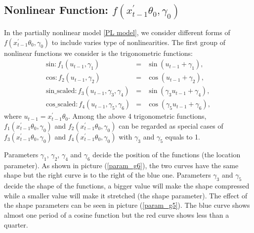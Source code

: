 \documentclass[a4paper,12pt,times,numbered,print,index]{report}
\numberwithin{equation}{section}
\begin{document}
\subsection{Nonlinear Function: $f\left(x_{t-1}^{\prime }\theta _{0},\gamma _{0}\right)$}
In the partially nonlinear model \ref{PL model}, we consider different forms of $f\left(x_{t-1}^{\prime }\theta _{0},\gamma _{0}\right)$ to include varies type of nonlinearities. The first group of nonlinear functions we consider is the trigonometric functions: 
\begin{eqnarray*}
	\text{sin}: f_{1}\left( u_{t-1},\gamma _{1}\right) &=&\sin \left( u_{t-1}+\gamma_{1}\right),  \\
	\text{cos}: f_{2}\left( u_{t-1},\gamma _{2}\right) &=&\cos \left( u_{t-1}+\gamma_{2}\right), \\
	\text{sin\_scaled}: f_{3}\left( u_{t-1},\gamma_{3}, \gamma_{4}\right) &=&\sin \left( \gamma_{3}u_{t-1}+\gamma_{4}\right),  \\
	\text{cos\_scaled}: f_{4}\left( u_{t-1},\gamma_{5}, \gamma_{6}\right) &=&\cos \left( \gamma_{5}u_{t-1}+\gamma_{6}\right),
\end{eqnarray*} 
where $u_{t-1} =  x_{t-1}^{\prime }\theta _{0}$.
Among the above 4 trigonometric functions, $f_{1} \left(x_{t-1}^{\prime }\theta _{0},\gamma _{0}\right)$ and $f_{2} \left(x_{t-1}^{\prime }\theta _{0},\gamma _{0}\right)$ can be regarded as special cases of $f_{3}\left(x_{t-1}^{\prime }\theta _{0},\gamma _{0}\right)$ and $f_{4} \left(x_{t-1}^{\prime }\theta _{0},\gamma _{0}\right)$ with $\gamma_{3}$ and $\gamma_{5}$ equals to 1. 

Parameters $\gamma_{1}$, $\gamma_{2}$, $\gamma_{4}$ and $\gamma_{6}$ decide the position of the functions (the location parameter). As shown in picture (\ref{param_g6}), the two curves have the same shape but the right curve is to the right of the blue one. Parameters $\gamma_{3}$ and $\gamma_{5}$ decide the shape of the functions, a bigger value will make the shape compressed while a smaller value will make it stretched (the shape parameter). The effect of the shape parameters can be seen in picture (\ref{param_g5}). The blue curve shows almost one period of a cosine function but the red curve shows less than a quarter.
\end{document}

